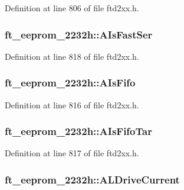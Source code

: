 Definition at line 806 of file ftd2xx.h.\hypertarget{structft__eeprom__2232h_a0d84c7ea097453ff9d222c12ffc145f8}{
\subsubsection[{AIsFastSer}]{ {\bf ft\_\-eeprom\_\-2232h::AIsFastSer}}}
\label{structft__eeprom__2232h_a0d84c7ea097453ff9d222c12ffc145f8}


Definition at line 818 of file ftd2xx.h.\hypertarget{structft__eeprom__2232h_a1f8310b3d7ee2c20328e1bdd812c0fa5}{
\subsubsection[{AIsFifo}]{ {\bf ft\_\-eeprom\_\-2232h::AIsFifo}}}
\label{structft__eeprom__2232h_a1f8310b3d7ee2c20328e1bdd812c0fa5}


Definition at line 816 of file ftd2xx.h.\hypertarget{structft__eeprom__2232h_a497cfb3ec327a899ea4a8904a355abba}{
\subsubsection[{AIsFifoTar}]{ {\bf ft\_\-eeprom\_\-2232h::AIsFifoTar}}}
\label{structft__eeprom__2232h_a497cfb3ec327a899ea4a8904a355abba}


Definition at line 817 of file ftd2xx.h.\hypertarget{structft__eeprom__2232h_add083043190baacddfb71891e65f0e35}{
\subsubsection[{ALDriveCurrent}]{ {\bf ft\_\-eeprom\_\-2232h::ALDriveCurrent}}}
\label{structft__eeprom__2232h_add083043190baacddfb71891e65f0e35}


